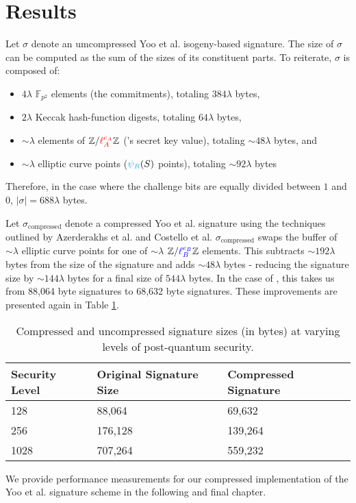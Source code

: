 \section{Results}

Let $\sigma$ denote an umcompressed Yoo et al. isogeny-based signature. The size of $\sigma$ can be computed as the sum of the sizes of its constituent parts. To reiterate, $\sigma$ is composed of:
\begin{itemize}
\item $4\lambda$ $\mathbb{F}_{p^2}$ elements (the commitments), totaling $384\lambda$ bytes,
\item $2\lambda$ Keccak hash-function digests, totaling $64\lambda$ bytes,
\item ${\sim}\lambda$ elements of $\mathbb{Z}/\textcolor{red}{\ell_{A}^{e_A}}\mathbb{Z}$ (\randall's secret key value), totaling ${\sim}48\lambda$ bytes, and
\item ${\sim}\lambda$ elliptic curve points ($\textcolor{cyan}{\psi_R}(S)$ points), totaling ${\sim}92\lambda$ bytes
\end{itemize}

Therefore, in the case where the challenge bits are equally divided between $1$ and $0$, $\vert \sigma \vert = 688\lambda$ bytes.

Let $\sigma_{\text{compressed}}$ denote a compressed Yoo et al. signature using the techniques outlined by Azerderakhs et al. and Costello et al. $\sigma_{\text{compressed}}$ swaps the buffer of ${\sim}\lambda$ elliptic curve points for one of ${\sim}\lambda$ $\mathbb{Z}/\textcolor{blue}{\ell_{B}^{e_B}}\mathbb{Z}$ elements. This subtracts ${\sim}192\lambda$ bytes from the size of the signature and adds ${\sim}48\lambda$ bytes - reducing the signature size by ${\sim}144\lambda$ bytes for a final size of $544\lambda$ bytes. In the case of \sidh, this takes us from 88,064 byte signatures to 68,632 byte signatures. These improvements are presented again in Table \ref{fig:sigsizeresults}.\\

\begin{table}[!h]
\begin{center}
\begin{tabular}{ | l | b | b | }
\hline
Security Level & Original Signature Size & Compressed Signature \\
\hline
128 & 88,064 & 69,632 \\
256 & 176,128 & 139,264 \\
1028 & 707,264 & 559,232 \\
\hline
\end{tabular}
\end{center}
\caption{Compressed and uncompressed signature sizes (in bytes) at varying levels of post-quantum security.}
\label{fig:sigsizeresults}
\end{table}

\noindent
We provide performance measurements for our compressed implementation of the Yoo et al. signature scheme in the following and final chapter.
